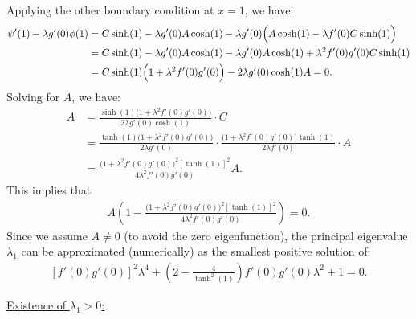 \documentclass[12pt, reqno]{amsart}
\numberwithin{equation}{section}
\begin{document}
Applying the other boundary condition at $x = 1$, we have:
\begin{align} \label{system_ACsolving2}
\psi'(1) - \lambda g'(0) \phi(1)
       &= C \sinh(1) - \lambda g'(0) A \cosh(1) - 
          \lambda g'(0) \Big(A \cosh(1) - \lambda f'(0) C \sinh(1) \Big) \notag \\
       &= C \sinh(1) - \lambda g'(0) A \cosh(1) - 
          \lambda g'(0) A \cosh(1) + \lambda^2 f'(0) g'(0) C \sinh(1) \notag \\
       &= C \sinh(1) \Big( 1 + \lambda^2 f'(0) 
          g'(0) \Big) - 2\lambda g'(0) \cosh(1) A = 0.
   \end{align}
Solving for $A$, we have:
   \begin{align*}
      A &= \frac{\sinh(1) \Big( 1 + \lambda^2 
            f'(0) g'(0) \Big)}{2\lambda g'(0) \cosh(1)} \cdot C \\
        &= \frac{\tanh(1) \Big( 1 + \lambda^2 
            f'(0) g'(0) \Big)}{2\lambda g'(0)} \cdot \frac{\Big( 1 + \lambda^2 f'(0) g'(0) \Big) \tanh(1)}{2 \lambda f'(0)} \cdot A  \\
        &= \frac{\Big( 1 + \lambda^2 f'(0) 
            g'(0) \Big)^2 [\tanh(1)]^2}
            {4 \lambda^2 f'(0) g'(0)} A.
   \end{align*}
   This implies that
   \begin{align*}
       A \left( 1 - \frac{\Big( 1 + \lambda^2 f'(0) g'(0) \Big)^2 [\tanh(1)]^2}
       {4 \lambda^2 f'(0) g'(0)} \right) = 0.
   \end{align*}
   Since we assume $A \neq 0$ (to avoid the zero eigenfunction), the principal eigenvalue  $\lambda_1$ can be approximated (numerically) as the smallest positive solution of:
   \begin{align} \label{system_mu1}
       \left[ f'(0) g'(0) \right]^2 \lambda^4 
        + \left( 2 - \frac{4}{\tanh^2(1)} \right) f'(0) g'(0) \lambda^2 
        + 1 = 0.
   \end{align}

\underline{Existence of $\lambda_1 > 0$:} \\
\end{document}
